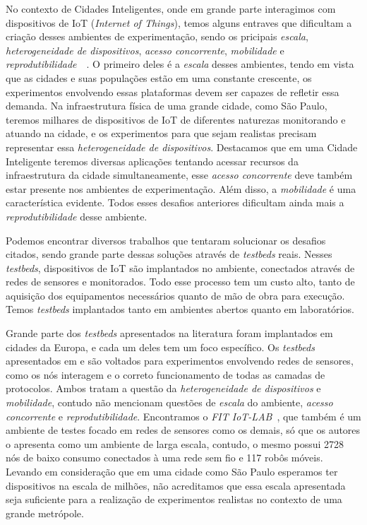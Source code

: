 No contexto de Cidades Inteligentes, onde em grande parte interagimos com dispositivos de IoT (\textit{Internet of Things}), temos alguns entraves que dificultam a criação desses ambientes de
experimentação, sendo os pricipais \textit{escala}, \textit{heterogeneidade de dispositivos}, \textit{acesso concorrente}, \textit{mobilidade} e 
\textit{reprodutibilidade}~\cite{gluhak_2011}~\cite{sanchez_2014}.
O primeiro deles é a \textit{escala} desses ambientes, tendo em vista que as cidades e suas populações estão em uma constante crescente, os experimentos envolvendo essas plataformas devem ser capazes
de refletir essa demanda.
Na infraestrutura física de uma grande cidade, como São Paulo, teremos milhares de dispositivos de IoT de diferentes naturezas monitorando e atuando na cidade, e os experimentos para que sejam realistas
precisam representar essa \textit{heterogeneidade de dispositivos}.
Destacamos que em uma Cidade Inteligente teremos diversas aplicações tentando acessar recursos da infraestrutura da cidade simultaneamente, esse \textit{acesso concorrente} deve também estar presente nos
ambientes de experimentação.
Além disso, a \textit{mobilidade} é uma característica evidente.
Todos esses desafios anteriores dificultam ainda mais a \textit{reprodutibilidade} desse ambiente.

Podemos encontrar diversos trabalhos que tentaram solucionar os desafios citados, sendo grande parte dessas soluções através de \textit{testbeds} reais.
Nesses \textit{testbeds}, dispositivos de IoT são implantados no ambiente, conectados através de redes de sensores e monitorados.
Todo esse processo tem um custo alto, tanto de aquisição dos equipamentos necessários quanto de mão de obra para execução.
Temos \textit{testbeds} implantados tanto em ambientes abertos quanto em laboratórios.

Grande parte dos \textit{testbeds} apresentados na literatura foram implantados em cidades da Europa, e cada um deles tem um foco específico.
Os \textit{testbeds} apresentados em  \cite{olivares_2013} e \cite{cenedese_2014} são voltados para experimentos envolvendo redes de sensores, como os nós interagem e o correto
funcionamento de todas as camadas de protocolos.
Ambos tratam a questão da \textit{heterogeneidade de dispositivos} e \textit{mobilidade}, contudo não mencionam questões de \textit{escala} do ambiente,
\textit{acesso concorrente} e \textit{reprodutibilidade}.
Encontramos o \textit{FIT IoT-LAB}~\cite{adjih_2015}, que também é um ambiente de testes focado em redes de sensores como os demais, só que os autores o apresenta como um ambiente de larga escala,
contudo, o mesmo possui 2728 nós de baixo consumo conectados à uma rede sem fio e 117 robôs móveis.
Levando em consideração que em uma cidade como São Paulo esperamos ter dispositivos na escala de milhões, não acreditamos que essa escala apresentada seja suficiente para a realização de experimentos
realistas no contexto de uma grande metrópole.

